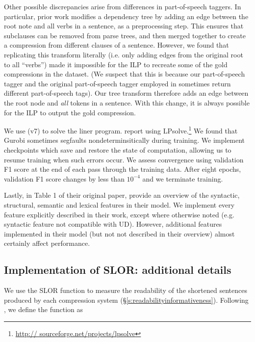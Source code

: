 Other possible discrepancies arise from differences in part-of-speech taggers. In particular, prior work modifies a dependency tree by adding an edge between the root note and all verbs in a sentence, as a preprocessing step. This ensures that subclauses can be removed from parse trees, and then merged together to create a compression from different clauses of a sentence. However, we found that replicating this transform literally (i.e. only adding edges from the original root to all ``verbs'') made it impossible for the ILP to recreate some of the gold compressions in the dataset. (We suspect that this is because our part-of-speech tagger and the original part-of-speech tagger employed in \citet{filippova2013overcoming} sometimes return different part-of-speech tags). Our tree transform therefore adds an edge between the root node and \textit{all} tokens in a sentence. With this change, it is always possible for the ILP to output the gold compression.

We use \citet{gurobi} (v7) to solve the liner program. \citet{filippova2008dependency} report using LPsolve.\footnote{\url{http://
sourceforge.net/projects/lpsolve}}  We found that Gurobi sometimes segfaults nondeterminsitically during training. We implement checkpoints which save and restore the state of computation, allowing us to resume training when such errors occur.  We assess convergence using validation F1 score at the end of each pass through the training data. After eight epochs, validation F1 score changes by less than $10^{-4}$ and we terminate training. 


Lastly, in Table 1 of their original paper, \citet{filippova2013overcoming} provide an overview of the syntactic, structural, semantic and lexical features in their model. We implement every feature explicitly described in their work, except where otherwise noted (e.g. syntactic feature not compatible with UD). However, additional features implemented in their model (but not not described in their overview) almost certainly affect performance. 


\subsection{Implementation of SLOR: additional details}

We use the SLOR function to measure the readability of the shortened sentences produced by each compression system (\S\ref{s:readabilityinformativeness}). Following \cite{lau2015unsupervised}, we define the function as 

